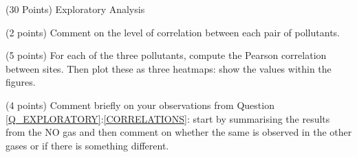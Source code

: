\documentclass[12pt]{article}
\begin{document}
\begin{question}{\label{Q_EXPLORATORY}(30 Points) Exploratory Analysis}
\begin{subquestion}



\end{subquestion}

\begin{subquestion}{(2 points) Comment on the level of correlation between each pair of pollutants.}






\end{subquestion}



\begin{subquestion}{\label{CORRELATIONS}(5 points) For each of the three pollutants, compute the Pearson correlation between sites.  Then plot these as three heatmaps: show the values within the figures. }






\end{subquestion}

\begin{subquestion}{(4 points) Comment briefly on your observations from Question \ref{Q_EXPLORATORY}:\ref{CORRELATIONS}: start by summarising the results from the NO gas and then comment on whether the same is observed in the other gases or if there is something different.}






\end{subquestion}

\end{question}


\end{document}
